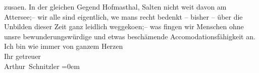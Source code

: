\begin{ledgroupsized}[t]{13cm}
                        zusa{\geminationm}en. In der gleichen Gegend Hofma{\geminationn}sthal,
                        Salten nicht weit davon am Attersee;– wir alle sind eigentlich, we{\geminationn} mans recht bedenkt – bisher – über die Unbilden
                    dieser Zeit ganz leidlich weggeko{\geminationm}en;– was fingen
                    wir Menschen ohne {\pb}unsre bewunderungswürdige
                    und etwas beschämende Accomodationsfähigkeit an.\pend
           \pstart
           Ich bin wie immer von ganzem Herzen{\\[\baselineskip]}Ihr getreuer{\\[\baselineskip]}\spacefill\mbox{Arthur Schnitzler}\pend
           \leftskip=0em{}\endnumbering{}\end{ledgroupsized}  \newcommand{\dateiname}{L02355}\newcommand{\titel}{Arthur Schnitzler an Georg Brandes, 21. 8. 1920}\newcommand{\editorInnen}{Martin Anton Müller und Gerd-Hermann Susen}
      